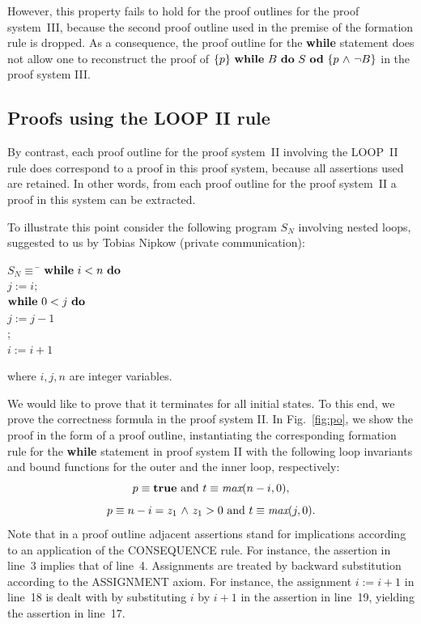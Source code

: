 \documentclass[manuscript, screen, review]{acmart}
\begin{document}
However, this property fails to hold for the proof outlines for the proof
system~III, because the second proof outline used in the premise of the
formation rule is dropped. As a consequence, the proof outline for the
\textbf{while} statement does not allow one to reconstruct the proof
of $\mbox{$\{{p}\}\ {\mbox{$\mbox{{\bf while}\ } {B}\ \mbox{{\bf do}\ } {S}\ \mbox{{\bf od}}$}}\ \{{p \mbox{$\ \wedge\ $} \neg B}\}$}$ in the proof system III.


\subsection{Proofs using the LOOP II rule}

By contrast, each proof outline for the proof system~II involving the LOOP~II rule
does correspond to a proof in this proof system, because all assertions
used are retained. In other words, from each proof outline for the
proof system~II a proof in this system can be extracted.  

To illustrate this point consider the following program $S_N$ involving nested
loops, suggested to us by Tobias Nipkow (private communication):

\begin{tabbing}
\qquad\qquad
$S_N \equiv$ \= $\mbox{$\mbox{{\bf while}\ } {i < n}\ \mbox{{\bf do}\ }$}$           \\
\> \qquad $j:=i; $                     \\
\> \qquad $\mbox{$\mbox{{\bf while}\ } {0 < j}\ \mbox{{\bf do}\ }$}$                 \\
\> \qquad \qquad $j:=j-1$              \\
\> \qquad \OD ;                        \\
\> \qquad $i:=i+1$                     \\
\> \OD                                               
\end{tabbing}
\noindent
where $i, j, n$ are integer variables. 

\III

We would like to prove that it terminates
for all initial states. To this end, we prove the correctness formula
 in the proof system II.
In Fig.~\ref{fig:po}, we show the proof in the form of a proof outline,
instantiating the corresponding formation rule for the \textbf{while} statement in proof system II
with the following loop invariants and bound functions for the outer and the inner loop, respectively:                                                  \\
\[
  \mbox{$p \equiv \mbox{{\bf true}}$ and $t \equiv  \mbox{\it max}(n-i,0)$,}
\]
\[
  \mbox{$p \equiv  n-i = z_1 \mbox{$\ \wedge\ $} z_1>0$ and $t \equiv \mbox{\it max}(j,0)$.}
\]
Note that in a proof outline adjacent assertions stand for implications
according to an application of the CONSEQUENCE rule.
For instance, the assertion in line~3 implies that of line~4.
Assignments are treated by backward substitution according to the ASSIGNMENT axiom.
For instance, the assignment $i:=i+1$ in line~18 is dealt with by 
substituting $i$ by $i+1$ in the assertion in line~19, yielding
the assertion in line~17.
\end{document}
